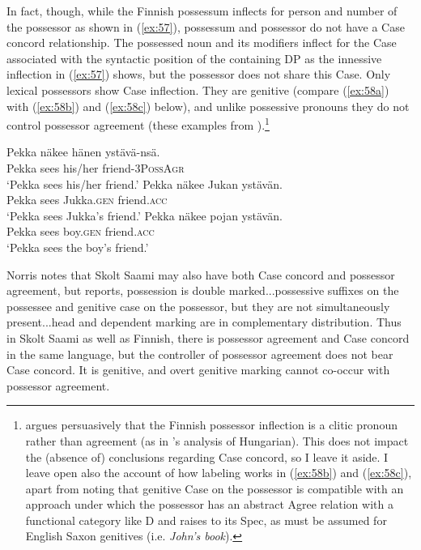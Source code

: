 \documentclass[output=paper
,modfonts
,nonflat]{langsci/langscibook}
\begin{document}
In fact, though, while the Finnish possessum inflects for person and number of the possessor as shown in (\ref{ex:57}), possessum and possessor do not have a Case concord relationship. The possessed noun and its modifiers inflect for the Case associated with the syntactic position of the containing DP as the innessive inflection in (\ref{ex:57}) shows, but the possessor does not share this Case. Only lexical possessors show Case inflection. They are genitive (compare (\ref{ex:58a}) with (\ref{ex:58b}) and (\ref{ex:58c}) below), and unlike possessive pronouns they do not control possessor agreement (these examples from \citealt[582-583]{Toivonen2000}).\footnote{\citet{Toivonen2000} argues persuasively that the Finnish possessor inflection is a clitic pronoun rather than agreement (as in \citealt{Den_Dikken2015}'s analysis of Hungarian). This does not impact the (absence of) conclusions regarding Case concord, so I leave it aside. I leave open also the account of how labeling works in (\ref{ex:58b}) and (\ref{ex:58c}), apart from noting that genitive Case on the possessor is compatible with an approach under which the possessor has an abstract Agree relation with a functional category like D and raises to its Spec, as must be assumed for English Saxon genitives (i.e. \textit{John's book}).}    

\begin{exe}
	\ex \label{ex:58} \xlist
	\ex \label{ex:58a}
	\gll Pekka n\"{a}kee  hänen     yst\"{a}v\"{a}-ns\"{a}.\\
	Pekka sees    his/her   friend-3P\textsc{oss}A\textsc{gr}\\
	\glt `Pekka sees his/her friend.'
	\ex \label{ex:58b}
	\gll Pekka n\"{a}kee   Jukan        yst\"{a}v\"{a}n.\\
	 Pekka sees       Jukka.\textsc{gen}   friend.\textsc{acc}\\
	\glt `Pekka sees Jukka's friend.'
	\ex \label{ex:58c}
	\gll Pekka n\"{a}kee   pojan       yst\"{a}v\"{a}n.\\
	Pekka sees     boy.\textsc{gen}     friend.\textsc{acc}\\
	\glt `Pekka sees the boy's friend.'
	\endxlist
\end{exe}
Norris notes that Skolt Saami may also have both Case concord and possessor agreement, but \citet{Miestamo2011} reports, {\textquotedbl}possession is double marked...possessive suffixes on the possessee and genitive case on the possessor, but they are not simultaneously present...head and dependent marking are in complementary distribution.{\textquotedbl} Thus in Skolt Saami as well as Finnish, there is possessor agreement and Case concord in the same language, but the controller of possessor agreement does not bear Case concord. It is genitive, and overt genitive marking cannot co-occur with possessor agreement. 
\end{document}
